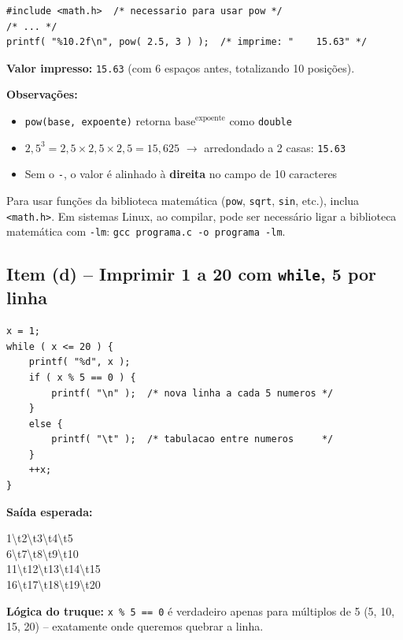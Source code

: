 \documentclass[12pt,a4paper]{article}
\begin{document}
\begin{respostabox}
\begin{lstlisting}
#include <math.h>  /* necessario para usar pow */
/* ... */
printf( "%10.2f\n", pow( 2.5, 3 ) );  /* imprime: "    15.63" */
\end{lstlisting}

\textbf{Valor impresso:} \texttt{15.63} (com 6 espaços antes, totalizando 10 posições).

\textbf{Observações:}
\begin{itemize}[noitemsep]
  \item \texttt{pow(base, expoente)} retorna $\text{base}^{\text{expoente}}$ como \texttt{double}
  \item $2{,}5^3 = 2{,}5 \times 2{,}5 \times 2{,}5 = 15{,}625$ \(\to\) arredondado a 2 casas: \texttt{15.63}
  \item Sem o \texttt{-}, o valor é alinhado à \textbf{direita} no campo de 10 caracteres
\end{itemize}

\begin{boaprática}
  Para usar funções da biblioteca matemática (\texttt{pow}, \texttt{sqrt}, \texttt{sin},
  etc.), inclua \texttt{<math.h>}. Em sistemas Linux, ao compilar, pode ser necessário
  ligar a biblioteca matemática com \texttt{-lm}: \texttt{gcc programa.c -o programa -lm}.
\end{boaprática}
\end{respostabox}

\subsection*{Item (d) -- Imprimir 1 a 20 com \texttt{while}, 5 por linha}

\begin{respostabox}
\begin{lstlisting}
x = 1;
while ( x <= 20 ) {
    printf( "%d", x );
    if ( x % 5 == 0 ) {
        printf( "\n" );  /* nova linha a cada 5 numeros */
    }
    else {
        printf( "\t" );  /* tabulacao entre numeros     */
    }
    ++x;
}
\end{lstlisting}

\textbf{Saída esperada:}
\begin{saida}
1\textbackslash{}t2\textbackslash{}t3\textbackslash{}t4\textbackslash{}t5\\
6\textbackslash{}t7\textbackslash{}t8\textbackslash{}t9\textbackslash{}t10\\
11\textbackslash{}t12\textbackslash{}t13\textbackslash{}t14\textbackslash{}t15\\
16\textbackslash{}t17\textbackslash{}t18\textbackslash{}t19\textbackslash{}t20
\end{saida}

\textbf{Lógica do truque:} \texttt{x \% 5 == 0} é verdadeiro apenas para múltiplos
de 5 (5, 10, 15, 20) -- exatamente onde queremos quebrar a linha.
\end{respostabox}
\end{document}
